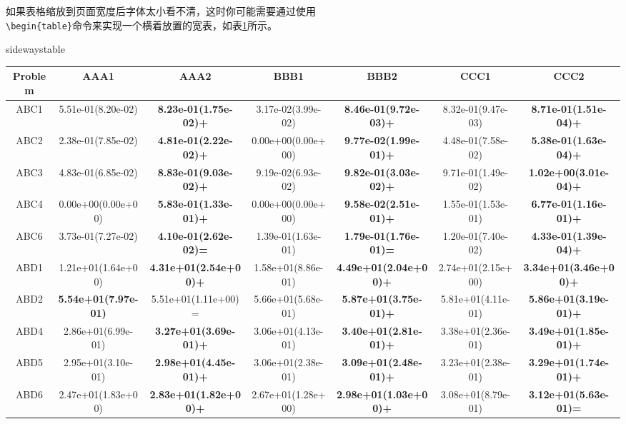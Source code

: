 如果表格缩放到页面宽度后字体太小看不清，这时你可能需要通过使用\\
\verb|\begin{table}|命令来实现一个横着放置的宽表，如表\ref{c1tab_5}所示。

\begin{table}
  \renewcommand{\arraystretch}{1.2}
  {sidewaystable}
  \label{c1tab_5}
  \centering
  \begin{tabular}{ccc|cc|cc}
  \toprule
  Problem	&	AAA1	&	AAA2	&	BBB1	&	BBB2	&	CCC1	&	CCC2	\\
  \midrule
  ABC1	&	5.51e-01(8.20e-02)	&	\textbf{8.23e-01(1.75e-02)+ }	&	3.17e-02(3.99e-02)	&	\textbf{8.46e-01(9.72e-03)+ }	&	8.32e-01(9.47e-03)	&	\textbf{8.71e-01(1.51e-04)+ }	\\
  ABC2	&	2.38e-01(7.85e-02)	&	\textbf{4.81e-01(2.22e-02)+ }	&	0.00e+00(0.00e+00)	&	\textbf{9.77e-02(1.99e-01)+ }	&	4.48e-01(7.58e-02)	&	\textbf{5.38e-01(1.63e-04)+ }	\\
  ABC3	&	4.83e-01(6.85e-02)	&	\textbf{8.83e-01(9.03e-02)+ }	&	9.19e-02(6.93e-02)	&	\textbf{9.82e-01(3.03e-02)+ }	&	9.71e-01(1.49e-02)	&	\textbf{1.02e+00(3.01e-04)+ }	\\
  ABC4	&	0.00e+00(0.00e+00)	&	\textbf{5.83e-01(1.33e-01)+ }	&	0.00e+00(0.00e+00)	&	\textbf{9.58e-02(2.51e-01)+ }	&	1.55e-01(1.53e-01)	&	\textbf{6.77e-01(1.16e-01)+ }	\\
  ABC6	&	3.73e-01(7.27e-02)	&	\textbf{4.10e-01(2.62e-02)= }	&	1.39e-01(1.63e-01)	&	\textbf{1.79e-01(1.76e-01)= }	&	1.20e-01(7.40e-02)	&	\textbf{4.33e-01(1.39e-04)+ }	\\
  ABD1	&	1.21e+01(1.64e+00)	&	\textbf{4.31e+01(2.54e+00)+ }	&	1.58e+01(8.86e-01)	&	\textbf{4.49e+01(2.04e+00)+ }	&	2.74e+01(2.15e+00)	&	\textbf{3.34e+01(3.46e+00)+ }	\\
  ABD2	&	\textbf{5.54e+01(7.97e-01)}	&	5.51e+01(1.11e+00)= 	&	5.66e+01(5.68e-01)	&	\textbf{5.87e+01(3.75e-01)+ }	&	5.81e+01(4.11e-01)	&	\textbf{5.86e+01(3.19e-01)+ }	\\
  ABD4	&	2.86e+01(6.99e-01)	&	\textbf{3.27e+01(3.69e-01)+ }	&	3.06e+01(4.13e-01)	&	\textbf{3.40e+01(2.81e-01)+ }	&	3.38e+01(2.36e-01)	&	\textbf{3.49e+01(1.85e-01)+ }	\\
  ABD5	&	2.95e+01(3.10e-01)	&	\textbf{2.98e+01(4.45e-01)+ }	&	3.06e+01(2.38e-01)	&	\textbf{3.09e+01(2.48e-01)+ }	&	3.23e+01(2.38e-01)	&	\textbf{3.29e+01(1.74e-01)+ }	\\
  ABD6	&	2.47e+01(1.83e+00)	&	\textbf{2.83e+01(1.82e+00)+ }	&	2.67e+01(1.28e+00)	&	\textbf{2.98e+01(1.03e+00)+ }	&	3.08e+01(8.79e-01)	&	\textbf{3.12e+01(5.63e-01)= }	\\

\end{tabular}
\end{table}
